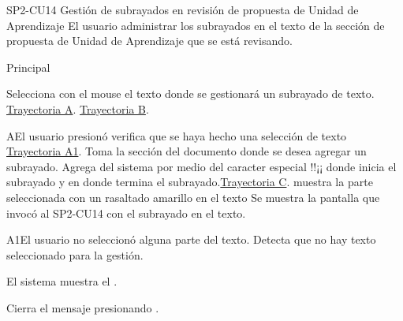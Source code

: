 \begin{UseCase}{SP2-CU14}{ Gestión de subrayados en revisión de propuesta de Unidad de Aprendizaje }{El usuario administrar los subrayados en el texto de la sección de propuesta de Unidad de Aprendizaje que se está revisando.}
{\begin{itemize}
        \end{itemize}
        }
\end{UseCase}

\begin{UCtrayectoria}{Principal}

    \UCpaso[\UCactor] Selecciona con el mouse el texto donde se gestionará un subrayado de texto. \hyperlink{SP2-CU14-A}{Trayectoria A}. \hyperlink{SP2-CU14-B}{Trayectoria B}.

\end{UCtrayectoria}

\begin{UCtrayectoriaA}{A}{El usuario presionó }
  \hypertarget{SP2-CU14-A}{}
    \UCpaso verifica que se haya hecho una selección de texto \hyperlink{SP2-CU14-A1}{Trayectoria A1}.
    \UCpaso Toma la sección del documento donde se desea agregar un subrayado.
    \UCpaso Agrega del sistema por medio del caracter especial !!¡¡ donde inicia el subrayado y en donde termina el subrayado.\hyperlink{SP2-CU14-C}{Trayectoria C}.
    \UCpaso muestra la parte seleccionada con un rasaltado amarillo en el texto
     \UCpaso Se muestra la pantalla que invocó al SP2-CU14 con el subrayado en el texto.

\end{UCtrayectoriaA}

\begin{UCtrayectoriaA}{A1}{El usuario no seleccionó alguna parte del texto.}
  \hypertarget{SP2-CU14-A1}{}
  \UCpaso Detecta que no hay texto seleccionado para la gestión.

  \UCpaso El sistema muestra el .

  \UCpaso[\UCactor] Cierra el mensaje presionando .

\end{UCtrayectoriaA}

